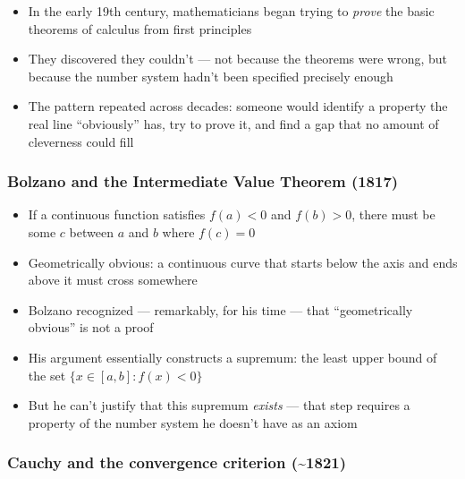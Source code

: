 \documentclass[
  10pt,
  letterpaper,
]{scrbook}
\providecommand{\tightlist}{%
  \setlength{\itemsep}{0pt}\setlength{\parskip}{0pt}}
\begin{document}
\begin{itemize}
\tightlist
\item
  In the early 19th century, mathematicians began trying to \emph{prove}
  the basic theorems of calculus from first principles
\item
  They discovered they couldn't --- not because the theorems were wrong,
  but because the number system hadn't been specified precisely enough
\item
  The pattern repeated across decades: someone would identify a property
  the real line ``obviously'' has, try to prove it, and find a gap that
  no amount of cleverness could fill
\end{itemize}

\subsubsection*{Bolzano and the Intermediate Value Theorem
(1817)}\label{bolzano-and-the-intermediate-value-theorem-1817}

\begin{itemize}
\tightlist
\item
  If a continuous function satisfies \(f(a) < 0\) and \(f(b) > 0\),
  there must be some \(c\) between \(a\) and \(b\) where \(f(c) = 0\)
\item
  Geometrically obvious: a continuous curve that starts below the axis
  and ends above it must cross somewhere
\item
  Bolzano recognized --- remarkably, for his time --- that
  ``geometrically obvious'' is not a proof
\item
  His argument essentially constructs a supremum: the least upper bound
  of the set \(\{x \in [a,b] : f(x) < 0\}\)
\item
  But he can't justify that this supremum \emph{exists} --- that step
  requires a property of the number system he doesn't have as an axiom
\end{itemize}

\subsubsection*{Cauchy and the convergence criterion
(\textasciitilde1821)}\label{cauchy-and-the-convergence-criterion-1821}
\end{document}
